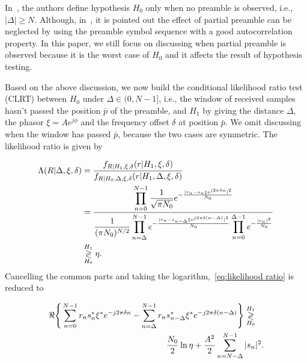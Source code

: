 In~\cite{Ramakrishnan_10,Chiani_06,Liang_15},
the authors define hypothesis $H_0$ only when no preamble
is observed, i.e., $|\Delta| \geq N$. Although, in~\cite{Chiani_06},
it is pointed out the effect of partial preamble can be neglected by
using the preamble symbol sequence with a good autocorrelation property.
In this paper, we still focus on discussing when partial preamble is observed because it is the worst case of $H_0$
and it affects the result of hypothesis testing.

Based on the above discussion, we now build the conditional likelihood ratio test (CLRT)
between $H_0$ under $\Delta \in(0,N-1]$, i.e., the window of received samples 
hasn't passed the position $\bar{p}$ of the preamble, 
and $H_1$ by giving the distance $\Delta$, the phasor $\xi=Ae^{j\phi}$ and
the frequency offset $\delta$ at position $\bar{p}$. We omit discussing when the window has passed $\bar{p}$,
because the two cases are symmetric. The likelihood ratio is given by 

\begin{equation}
    \label{eq:likelihood ratio}
    \begin{aligned}
    \Lambda(R|\Delta,\xi,\delta)&=\frac{f_{R|H_1,\xi,\delta}(r|H_1,\xi,\delta)}{f_{R|H_0,\Delta,\xi,\delta}(r|H_1,\Delta,\xi,\delta)} \\
    &=\frac{\displaystyle \prod_{n=0}^{N-1}\frac{1}{\sqrt{\pi N_0}}e^{-\frac{|r_n-s_n\xi e^{j2\pi\delta n}|^2}{N_0}}}{\displaystyle \frac{1}{(\pi N_0)^{N/2}}\prod_{n=\Delta}^{N-1}e^{-\frac{|r_n-s_{n-\Delta}\xi e^{j2\pi\delta (n-\Delta)}|^2}{N_0}}\prod_{n=0}^{\Delta-1}e^{-\frac{|r_n|^2}{N_0}}} \\
    & \mathrel{\mathop\gtrless\limits^{H_1}_{H_0}} \eta.
    \end{aligned}
  \end{equation}
Cancelling the common parts and taking the logarithm,~\eqref{eq:likelihood ratio} is reduced to

\begin{equation}
    \label{eq:log likelihood}
    \begin{aligned}
    \Re\Bigg\{\sum_{n=0}^{N-1}r_ns_n^*\xi^*e^{-j2\pi\delta n}-\sum_{n=\Delta}^{N-1}r_n&s_{n-\Delta}^*\xi^*e^{-j2\pi\delta(n-\Delta)}\Bigg\} \mathrel{\mathop\gtrless\limits^{H_1}_{H_0}} \\
    &\frac{N_0}{2}\ln\eta+\frac{A^2}{2}\sum_{n=N-\Delta}^{N-1}|s_n|^2.
    \end{aligned}
\end{equation}

